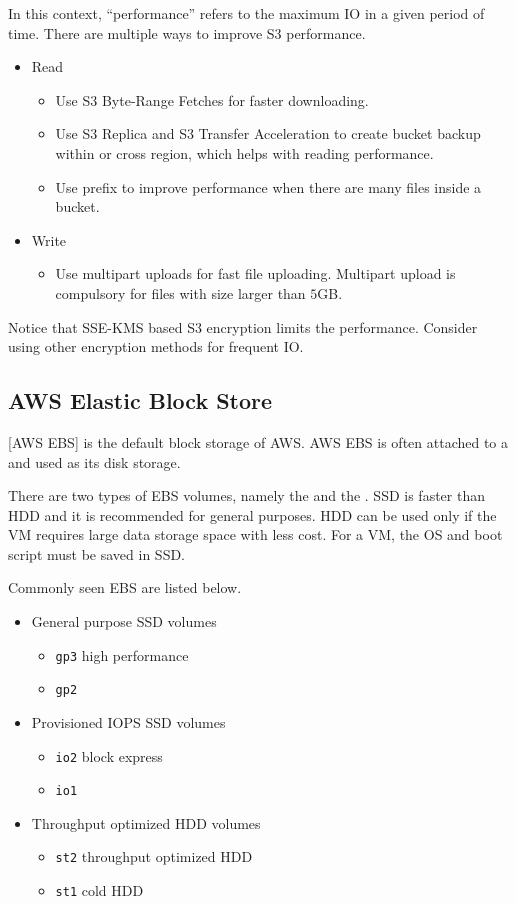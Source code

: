 In this context, ``performance'' refers to the maximum IO in a given period of time. There are multiple ways to improve S3 performance.
\begin{itemize}
	\item Read
	\begin{itemize}
		\item Use S3 Byte-Range Fetches for faster downloading.
		\item Use S3 Replica and S3 Transfer Acceleration to create bucket backup within or cross region, which helps with reading performance.
		\item Use prefix to improve performance when there are many files inside a bucket.
	\end{itemize}
	\item Write 
	\begin{itemize}
		\item Use multipart uploads for fast file uploading. Multipart upload is compulsory for files with size larger than $5$GB.
	\end{itemize}
\end{itemize}

Notice that SSE-KMS based S3 encryption limits the performance. Consider using other encryption methods for frequent IO.

\subsection{AWS Elastic Block Store}

[AWS EBS] is the default block storage of AWS. AWS EBS is often attached to a  and used as its disk storage. 

There are two types of EBS volumes, namely the  and the . SSD is faster than HDD and it is recommended for general purposes. HDD can be used only if the VM requires large data storage space with less cost. For a VM, the OS and boot script must be saved in SSD.

Commonly seen EBS are listed below.
\begin{itemize}
	\item General purpose SSD volumes
	\begin{itemize}
		\item \verb|gp3| high performance
		\item \verb|gp2|
	\end{itemize}
	\item Provisioned IOPS SSD volumes
	\begin{itemize}
		\item \verb|io2| block express
		\item \verb|io1|
	\end{itemize}
	\item Throughput optimized HDD volumes
	\begin{itemize}
		\item \verb|st2| throughput optimized HDD
		\item \verb|st1| cold HDD
	\end{itemize}
\end{itemize}

